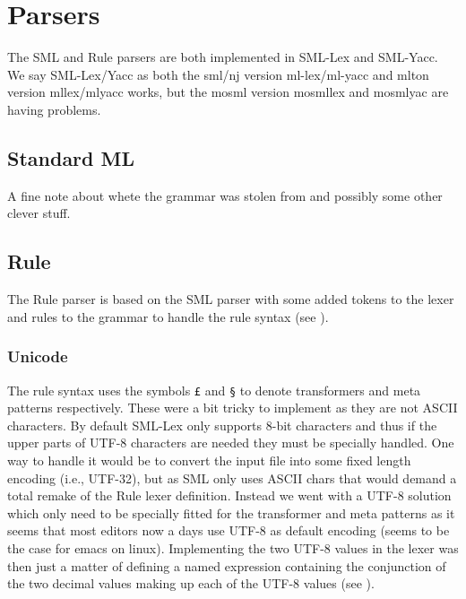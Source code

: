 
\section{Parsers}

The SML and Rule parsers are both implemented in SML-Lex and SML-Yacc. We say
SML-Lex/Yacc as both the sml/nj version ml-lex/ml-yacc and mlton version
mllex/mlyacc works, but the mosml version mosmllex and mosmlyac are having
problems.


\subsection{Standard ML}

A fine note about whete the grammar was stolen from and possibly some other
clever stuff.

\subsection{Rule}

The Rule parser is based on the SML parser with some added tokens to the lexer
and rules to the grammar to handle the rule syntax (see
). 


\subsubsection{Unicode}

The rule syntax uses the symbols \texttt{£} and \texttt{§} to denote
transformers and meta patterns respectively. These were a bit tricky to
implement as they are not ASCII characters. By default SML-Lex\cite{ml-lex-yacc}
only supports 8-bit characters and thus if the upper parts of UTF-8 characters
are needed they must be specially handled. One way to handle it would be to
convert the input file into some fixed length encoding (i.e., UTF-32), but as
SML only uses ASCII chars that would demand a total remake of the Rule lexer
definition. Instead we went with a UTF-8 solution which only need to be
specially fitted for the transformer and meta patterns as it seems that most
editors now a days use UTF-8 as default encoding (seems to be the case for emacs
on linux). Implementing the two UTF-8 values in the lexer was then just a matter
of defining a named expression containing the conjunction of the two decimal
values making up each of the UTF-8 values (see ).

